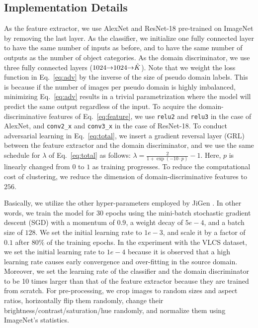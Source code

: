 \documentclass[letterpaper]{article} \usepackage{aaai20}  \usepackage{times}  \usepackage{helvet} \usepackage{courier}  \usepackage[hyphens]{url}  \usepackage{graphicx} \urlstyle{rm} \def\UrlFont{\rm}  \usepackage{graphicx}  \usepackage[whole]{bxcjkjatype}
\begin{document}
\subsection{Implementation Details}
As the feature extractor, we use AlexNet and ResNet-18 pre-trained on ImageNet by removing the last layer. As the classifier, we initialize one fully connected layer to have the same number of inputs as before, and to have the same number of outputs as the number of object categories.
As the domain discriminator, we use three fully connected layers ($1024\mathalpha{\rightarrow}1024\mathalpha{\rightarrow}\hat{K}$).
Note that we weight the loss function in Eq.~\ref{eq:adv} by the inverse of the size of pseudo domain labels.
This is because if the number of images per pseudo domain is highly imbalanced, minimizing Eq.~\ref{eq:adv} results in a trivial parametrization where the model will predict the same output regardless of the input.
To acquire the domain-discriminative features of Eq.~\ref{eq:feature}, we use \texttt{relu2} and \texttt{relu3} in the case of AlexNet, and \texttt{conv2\_x} and \texttt{conv3\_x} in the case of ResNet-18.
To conduct adversarial learning in Eq.~\ref{eq:total}, we insert a gradient reversal layer (GRL) \cite{GRL} between the feature extractor and the domain discriminator, and we use the same schedule for $\lambda$ of Eq.~\ref{eq:total} as follows: $\lambda=\frac{2}{1+\exp(-10\cdot p)}-1$.
Here, $p$ is linearly changed from $0$ to $1$ as training progresses.
To reduce the computational cost of clustering, we reduce the dimension of domain-discriminative features to $256$.\par
Basically, we utilize the other hyper-parameters employed by JiGen \cite{JiGen}. In other words, we train the model for $30$ epochs using the mini-batch stochastic gradient descent (SGD) with a momentum of $0.9$, a weight decay of $5e-4$, and a batch size of $128$.
We set the initial learning rate to $1e-3$, and scale it by a factor of $0.1$ after $80\%$ of the training epochs.
In the experiment with the VLCS dataset, we set the initial learning rate to $1e-4$ because it is observed that a high learning rate causes early convergence and over-fitting in the source domain.
Moreover, we set the learning rate of the classifier and the domain discriminator to be 10 times larger than that of the feature extractor because they are trained from scratch.
For pre-processing, we crop images to random sizes and aspect ratios, horizontally flip them randomly, change their brightness/contrast/saturation/hue randomly, and normalize them using ImageNet's statistics.
\end{document}
